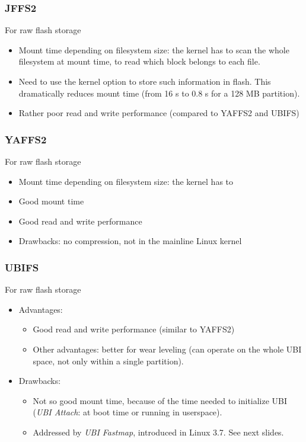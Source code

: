 \begin{frame}
\frametitle{JFFS2}
For raw flash storage
\begin{itemize}
\item Mount time depending on filesystem size: the kernel has to
      scan the whole filesystem at mount time, to read which block
      belongs to each file.
\item Need to use the  kernel option
      to store such information in flash. This dramatically reduces
      mount time (from 16 s to 0.8 s for a 128 MB partition).
\item Rather poor read and write performance (compared to YAFFS2 and
      UBIFS)
\end{itemize}
\end{frame}

\begin{frame}
\frametitle{YAFFS2}
For raw flash storage
\begin{itemize}
\item Mount time depending on filesystem size: the kernel has to
\item Good mount time
\item Good read and write performance
\item Drawbacks: no compression, not in the mainline Linux kernel
\end{itemize}
\end{frame}

\begin{frame}
\frametitle{UBIFS}
For raw flash storage
\begin{itemize}
\item Advantages:
      \begin{itemize}
      \item Good read and write performance (similar to YAFFS2)
      \item Other advantages: better for wear leveling (can operate on the
      	    whole UBI space, not only within a single partition).
      \end{itemize}
\item Drawbacks:
      \begin{itemize}
      \item Not so good mount time, because of the time needed
            to initialize UBI ({\em UBI Attach}: at boot time or running
             in userspace).
      \item Addressed by {\em UBI Fastmap}, introduced in Linux 3.7.
            See next slides.
      \end{itemize}
\end{itemize}
\end{frame}

